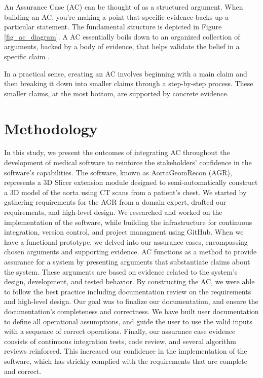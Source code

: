 An Assurance Case (AC) can be thought of as a structured argument. When building an AC, you're making a point that specific evidence backs up a particular statement. The fundamental structure is depicted in Figure \ref{fig_ac_diagram}. A AC essentially boils down to an organized collection of arguments, backed by a body of evidence, that helps validate the belief in a specific claim \cite{doi:10.2514/6.2009-1921}.

In a practical sense, creating an AC involves beginning with a main claim and then breaking it down into smaller claims through a step-by-step process. These smaller claims, at the most bottom, are supported by concrete evidence.


\section{Methodology} \label{methodology}
In this study, we present the outcomes of integrating AC throughout the development of medical software to reinforce the stakeholders' confidence in the software's capabilities. The software, known as AortaGeomRecon (AGR), represents a 3D Slicer \cite{Kikinis2014} extension module designed to semi-automatically construct a 3D model of the aorta using CT scans from a patient's chest. We started by gathering requirements for the AGR from a domain expert, drafted our requirements, and high-level design. We researched and worked on the implementation of the software, while building the infrastructure for continuous integration, version control, and project managment using GitHub. When we have a functional prototype, we delved into our assurance cases, encompassing chosen arguments and supporting evidence. AC functions as a method to provide assurance for a system by presenting arguments that substantiate claims about the system. These arguments are based on evidence related to the system's design, development, and tested behavior. By constructing the AC, we were able to follow the best practice including documentation review on the requirements and high-level design. Our goal was to finalize our documentation, and ensure the documentation's completeness and correctness. We have built user documentation to define all operational assumptions, and guide the user to use the valid inputs with a sequence of correct operations. Finally, our assurance case evidence consists of continuous integration tests, code review, and several algorithm reviews reinforced. This increased our confidence in the implementation of the software, which has strickly complied with the requirements that are complete and correct.

